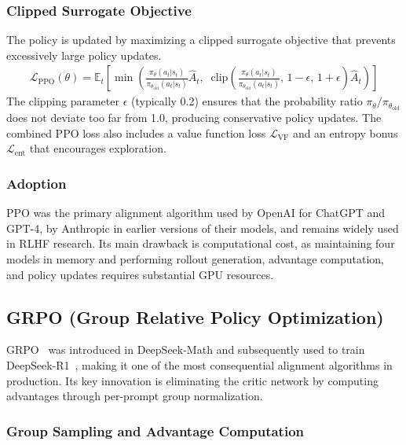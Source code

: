 \documentclass[12pt]{article}
\begin{document}
\subsubsection{Clipped Surrogate Objective}

The policy is updated by maximizing a clipped surrogate objective that prevents excessively large policy updates.
\begin{align}
\mathcal{L}_{\text{PPO}}(\theta) = \mathbb{E}_t \left[ \min\!\left( \frac{\pi_\theta(a_t | s_t)}{\pi_{\theta_{\text{old}}}(a_t | s_t)} \hat{A}_t, \;\; \text{clip}\!\left(\frac{\pi_\theta(a_t | s_t)}{\pi_{\theta_{\text{old}}}(a_t | s_t)},\, 1-\epsilon,\, 1+\epsilon\right) \hat{A}_t \right) \right]
\end{align}
The clipping parameter $\epsilon$ (typically 0.2) ensures that the probability ratio $\pi_\theta / \pi_{\theta_{\text{old}}}$ does not deviate too far from 1.0, producing conservative policy updates. The combined PPO loss also includes a value function loss $\mathcal{L}_{\text{VF}}$ and an entropy bonus $\mathcal{L}_{\text{ent}}$ that encourages exploration.

\subsubsection{Adoption}

PPO was the primary alignment algorithm used by OpenAI for ChatGPT and GPT-4, by Anthropic in earlier versions of their models, and remains widely used in RLHF research. Its main drawback is computational cost, as maintaining four models in memory and performing rollout generation, advantage computation, and policy updates requires substantial GPU resources.

\subsection{GRPO (Group Relative Policy Optimization)}

GRPO~\cite{Shao2024DeepSeekMath} was introduced in DeepSeek-Math and subsequently used to train DeepSeek-R1~\cite{Guo2025DeepSeekR1}, making it one of the most consequential alignment algorithms in production. Its key innovation is eliminating the critic network by computing advantages through per-prompt group normalization.

\subsubsection{Group Sampling and Advantage Computation}
\end{document}
